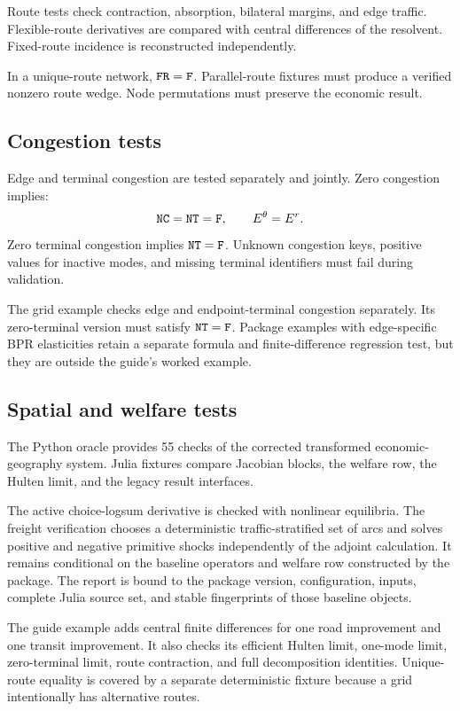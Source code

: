 Route tests check contraction, absorption, bilateral margins, and edge traffic.
Flexible-route derivatives are compared with central differences of the
resolvent. Fixed-route incidence is reconstructed independently.

In a unique-route network, \(\texttt{FR}=\texttt{F}\). Parallel-route fixtures must
produce a verified nonzero route wedge. Node permutations must preserve the
economic result.

\subsection{Congestion tests}

Edge and terminal congestion are tested separately and jointly. Zero
congestion implies:
\[
 \texttt{NC}=\texttt{NT}=\texttt{F},
 \qquad
 E^{\theta}=E^{r}.
\]
Zero terminal congestion implies \(\texttt{NT}=\texttt{F}\). Unknown congestion
keys, positive values for inactive modes, and missing terminal identifiers
must fail during validation.

The grid example checks edge and endpoint-terminal congestion separately. Its
zero-terminal version must satisfy \(\texttt{NT}=\texttt{F}\). Package examples
with edge-specific BPR elasticities retain a separate formula and
finite-difference regression test, but they are outside the guide's worked
example.

\subsection{Spatial and welfare tests}

The Python oracle provides 55 checks of the corrected transformed
economic-geography system. Julia fixtures compare Jacobian blocks, the welfare
row, the Hulten limit, and the legacy result interfaces.

The active choice-logsum derivative is checked with nonlinear equilibria. The
freight verification chooses a deterministic traffic-stratified set of arcs
and solves positive and negative primitive shocks independently of the adjoint
calculation. It remains conditional on the baseline operators and welfare row
constructed by the package. The report is bound to the package version,
configuration, inputs, complete Julia source set, and stable fingerprints of
those baseline objects.

The guide example adds central finite differences for one road improvement and
one transit improvement. It also checks its efficient Hulten limit, one-mode
limit, zero-terminal limit, route contraction, and full decomposition
identities. Unique-route equality is covered by a separate deterministic
fixture because a grid intentionally has alternative routes.


